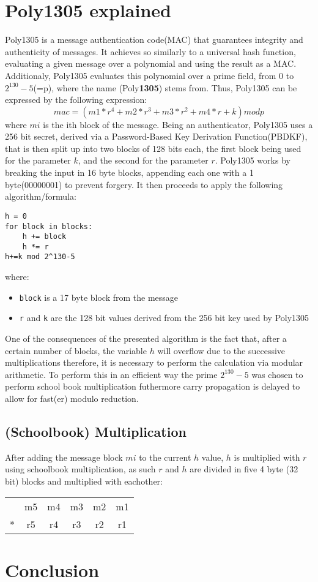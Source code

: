 \documentclass[twocolumn]{article}
\begin{document}
\section{Poly1305 explained}
Poly1305 is a message authentication code(MAC) that guarantees integrity and authenticity of messages. It achieves so similarly to a universal hash function, evaluating 
a given message over a polynomial and using the result as a MAC. Additionaly, Poly1305 evaluates this polynomial over a prime field, from 0 to $2^{130}-5$(=p), where the 
name (Poly\textbf{1305}) stems from. Thus, Poly1305 can be expressed by the following expression: $$mac = (m1 * r^4 + m2 * r^3 + m3 * r^2 + m4 * r + k) mod p $$ where $mi$
is the ith block of the message. Being an authenticator, Poly1305 uses a 256 bit secret, derived via a Password-Based Key Derivation Function(PBDKF), that is then split up 
into two blocks of 128 bits each, the first block being used for the parameter $k$, and the second for the parameter $r$. Poly1305 works by breaking the input in 16 byte 
blocks, appending each one with a 1 byte(00000001) to prevent forgery. It then proceeds to apply the following algorithm/formula:

\begin{verbatim}
h = 0
for block in blocks:
    h += block
    h *= r
h+=k mod 2^130-5
\end{verbatim}

where:
\begin{itemize}
    \item \texttt{block} is a 17 byte block from the message 
    \item \texttt{r} and \texttt{k} are the 128 bit values derived from the 256 bit key used by Poly1305
\end{itemize}

One of the consequences of the presented algorithm is the fact that, after a certain number of blocks, the variable $h$ will overflow due to the successive multiplications 
therefore, it is necessary to perform the calculation via modular arithmetic. To perform this in an efficient way the prime $2^{130}-5$ was chosen to perform school book 
multiplication futhermore carry propagation is delayed to allow for fast(er) modulo reduction.

\subsection{(Schoolbook) Multiplication}
After adding the message block $mi$ to the current $h$ value, $h$ is multiplied with $r$ using schoolbook multiplication, as such $r$ and $h$ are divided in five 4 byte
(32 bit) blocks and multiplied with eachother:
\begin{tabular}{cccccc}
    & m5 & m4 & m3 & m2 & m1 \\
*   & r5 & r4 & r3 & r2 & r1 \\
\hline
\end{tabular}

\section{Conclusion}

\printbibliography
\end{document}
